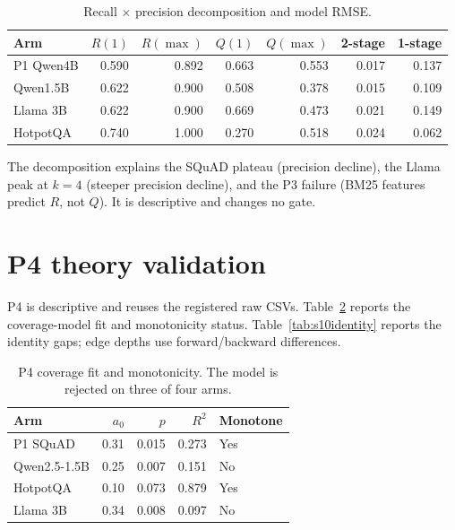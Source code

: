 \documentclass[a4paper,fleqn]{cas-sc}
\begin{document}
\begin{table}[pos=htbp]
  \centering
  \caption{Recall $\times$ precision decomposition and model RMSE.}
  \label{tab:s9brq}
  \footnotesize
  \begin{tabular}{@{}lrrrrrr@{}}
    \toprule
    Arm & $R(1)$ & $R(\max)$ & $Q(1)$ & $Q(\max)$ & 2-stage & 1-stage \\
    \midrule
    P1 Qwen4B & 0.590 & 0.892 & 0.663 & 0.553 & 0.017 & 0.137 \\
    Qwen1.5B & 0.622 & 0.900 & 0.508 & 0.378 & 0.015 & 0.109 \\
    Llama 3B & 0.622 & 0.900 & 0.669 & 0.473 & 0.021 & 0.149 \\
    HotpotQA & 0.740 & 1.000 & 0.270 & 0.518 & 0.024 & 0.062 \\
    \bottomrule
  \end{tabular}
\end{table}

The decomposition explains the SQuAD plateau (precision decline), the Llama peak
at $k=4$ (steeper precision decline), and the P3 failure (BM25 features predict
$R$, not $Q$). It is descriptive and changes no gate.

\section{P4 theory validation}\label{sec:s10}

P4 is descriptive and reuses the registered raw CSVs. Table~\ref{tab:s10coverage}
reports the coverage-model fit and monotonicity status. Table~\ref{tab:s10identity}
reports the identity gaps; edge depths use forward/backward differences.

\begin{table}[pos=htbp]
  \centering
  \caption{P4 coverage fit and monotonicity. The model is rejected on three of
  four arms.}
  \label{tab:s10coverage}
  \footnotesize
  \begin{tabular}{@{}lrrrl@{}}
    \toprule
    \textbf{Arm} & $a_0$ & $p$ & $R^2$ & \textbf{Monotone} \\
    \midrule
    P1 SQuAD & 0.31 & 0.015 & 0.273 & Yes \\
    Qwen2.5-1.5B & 0.25 & 0.007 & 0.151 & No \\
    HotpotQA & 0.10 & 0.073 & 0.879 & Yes \\
    Llama 3B & 0.34 & 0.008 & 0.097 & No \\
    \bottomrule
  \end{tabular}
\end{table}
\end{document}
